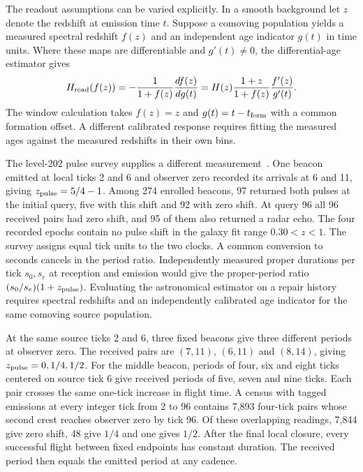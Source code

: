 \documentclass[11pt]{article}
\theoremstyle{remark}
\theoremstyle{plain}
\begin{document}
The readout assumptions can be varied explicitly. In a smooth background
let $z$ denote the redshift at emission time $t$. Suppose a comoving
population yields a measured spectral redshift $f(z)$ and an independent
age indicator $g(t)$ in time units. Where these maps are differentiable
and $g'(t)\ne0$, the differential-age estimator gives
\[
 H_{\rm read}(f(z))
 =-\frac{1}{1+f(z)}\frac{df(z)}{dg(t)}
 =H(z)\frac{1+z}{1+f(z)}\frac{f'(z)}{g'(t)} .
\]
The window calculation takes $f(z)=z$ and $g(t)=t-t_{\rm form}$ with a
common formation offset. A different calibrated response requires fitting
the measured ages against the measured redshifts in their own bins.

The level-202 pulse survey supplies a different measurement~\cite{ophcmb}.
One beacon emitted at local ticks 2 and 6 and observer zero recorded its
arrivals at 6 and 11, giving $z_{\rm pulse}=5/4-1$. Among 274 enrolled
beacons, 97 returned both pulses at the initial query, five with this
shift and 92 with zero shift. At query 96 all 96 received pairs had zero
shift, and 95 of them also returned a radar echo. The four recorded
epochs contain no pulse shift in the galaxy fit range $0.30<z<1$.
The survey assigns equal tick units to the two clocks. A common conversion
to seconds cancels in the period ratio. Independently measured proper
durations per tick $s_0,s_e$ at reception and emission would give the
proper-period ratio $(s_0/s_e)(1+z_{\rm pulse})$.
Evaluating the astronomical estimator on a repair history requires
spectral redshifts and an independently calibrated age indicator for the
same comoving source population.

At the same source ticks 2 and 6, three fixed beacons give three
different periods at observer zero. The received pairs are $(7,11)$,
$(6,11)$ and $(8,14)$, giving $z_{\rm pulse}=0,1/4,1/2$.
For the middle beacon, periods of four, six and eight ticks centered
on source tick 6 give received periods of five, seven and nine ticks.
Each pair crosses the same one-tick increase in flight time.
A census with tagged emissions at every integer tick from 2 to 96
contains 7,893 four-tick pairs whose second crest reaches observer zero
by tick 96. Of these overlapping readings, 7,844 give zero shift,
48 give $1/4$ and one gives $1/2$. After the final local closure,
every successful flight between fixed endpoints has constant duration.
The received period then equals the emitted period at any cadence.
\end{document}

